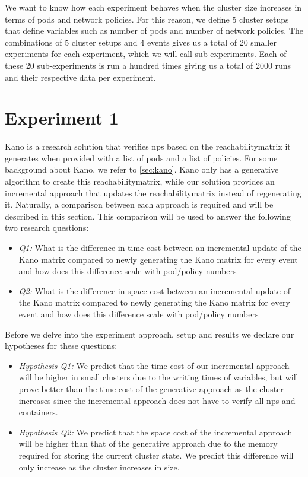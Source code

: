 We want to know how each experiment behaves when the cluster size increases in terms of pods and network policies. For this reason, we define 5 cluster setups that define variables such as number of pods and number of network policies. The combinations of 5 cluster setups and 4 events gives us a total of 20 smaller experiments for each experiment,  which we will call sub-experiments.  Each of these 20 sub-experiments is run a hundred times giving us a total of 2000 runs and their respective data per experiment.
\\[10pt]


\section{Experiment 1}\label{sec:experiment1}
Kano is a research solution that verifies \acrshort{np}s based on the reachabilitymatrix it generates when provided with a list of pods and a list of policies. For some background about Kano, we refer to \autoref{sec:kano}. Kano only has a generative algorithm to create this reachabilitymatrix, while our solution provides an incremental approach that updates the reachabilitymatrix instead of regenerating it. Naturally, a comparison between each approach is required and will be described in this section. This comparison will be used to answer the following two research questions:

\begin{itemize}
    \item \textit{Q1:} What is the difference in time cost between an incremental update of the Kano matrix compared to newly generating the Kano matrix for every event and how does this difference scale with pod/policy numbers
    \item \textit{Q2:} What is the difference in space cost between an incremental update of the Kano matrix compared to newly generating the Kano matrix for every event and how does this difference scale with pod/policy numbers
\end{itemize}

Before we delve into the experiment approach, setup and results we declare our hypotheses for these questions:

\begin{itemize}
    \item \textit{Hypothesis Q1:} We predict that the time cost of our incremental approach will be higher in small clusters due to the writing times of variables, but will prove better than the time cost of the generative approach as the cluster increases since the incremental approach does not have to verify all \acrshort{np}s and containers.
    \item \textit{Hypothesis Q2:} We predict that the space cost of the incremental approach will be higher than that of the generative approach due to the memory required for storing the current cluster state. We predict this difference will only increase as the cluster increases in size.
\end{itemize}

